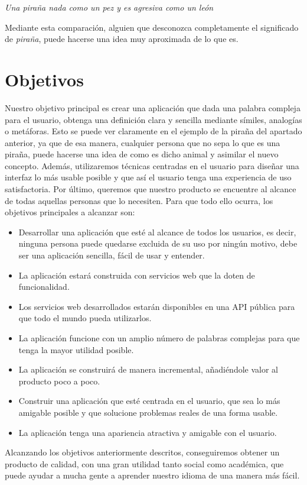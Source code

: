 \textit{Una piraña nada como un pez y es agresiva como un león} \newline

Mediante esta comparación, alguien que desconozca completamente el significado de \textit{piraña}, puede hacerse una idea muy aproximada de lo que es.


\section{Objetivos}
\label{cap:sec:objetivos}

Nuestro objetivo principal es crear una aplicación que dada una palabra compleja para el usuario, obtenga una definición clara y sencilla mediante símiles, analogías o metáforas. 
Esto se puede ver claramente en el ejemplo de la piraña del apartado anterior, ya que de esa manera, cualquier persona que no sepa lo que es una piraña, puede hacerse una idea de como es dicho animal y asimilar el nuevo concepto. Además, utilizaremos técnicas centradas en el usuario para diseñar una interfaz lo más usable posible y que así el usuario tenga una experiencia de uso satisfactoria. Por último, queremos que nuestro producto se encuentre al alcance de todas aquellas personas que lo necesiten.
 Para que todo ello ocurra, los objetivos principales a alcanzar son:
\begin{itemize}
	\item Desarrollar una aplicación que esté al alcance de todos los usuarios, es decir, ninguna persona puede quedarse excluida de su uso por ningún motivo, debe ser una aplicación sencilla, fácil de usar y entender.
	\item La aplicación estará construida con servicios web que la doten de funcionalidad.
	\item Los servicios web desarrollados estarán disponibles en una API pública para que todo el mundo pueda utilizarlos.	
	\item La aplicación funcione con un amplio número de palabras complejas para que tenga la mayor utilidad posible.
	\item La aplicación se construirá de manera incremental, añadiéndole valor al producto poco a poco.	
	\item Construir una aplicación que esté centrada en el usuario, que sea lo más amigable posible y que solucione problemas reales de una forma usable.		
	\item La aplicación tenga una apariencia atractiva y amigable con el usuario.
\end{itemize}
Alcanzando los objetivos anteriormente descritos, conseguiremos obtener un producto de calidad, con una gran utilidad tanto social como académica, que puede ayudar a mucha gente a aprender nuestro idioma de una manera más fácil.

